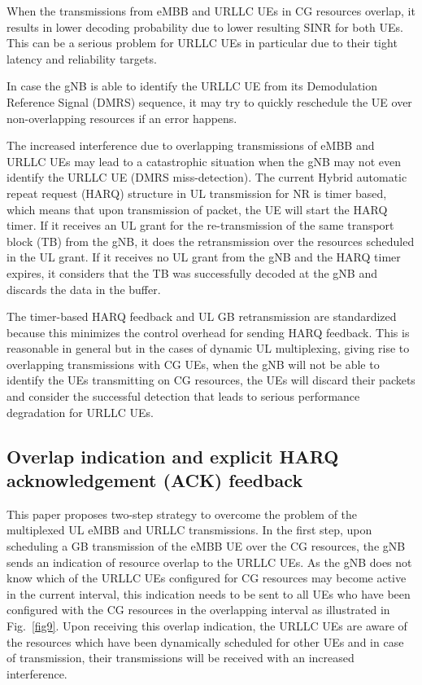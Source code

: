 \documentclass{report}
\begin{document}
When the transmissions from eMBB and URLLC UEs in CG resources overlap, it results in lower decoding probability due to lower resulting SINR for both UEs. This can be a serious problem for URLLC UEs in particular due to their tight latency and reliability targets.

In case the gNB is able to identify the URLLC UE from its Demodulation Reference Signal (DMRS) sequence, it may try to quickly reschedule the UE over non-overlapping resources if an error happens.

The increased interference due to overlapping transmissions of eMBB and URLLC UEs may lead to a catastrophic situation when the gNB may not even identify the URLLC UE (DMRS miss-detection). The current Hybrid automatic repeat request (HARQ) structure in UL transmission for NR is timer based, which means that upon transmission of packet, the UE will start the HARQ timer. If it receives an UL grant for the re-transmission of the same transport block (TB) from the gNB, it does the retransmission over the resources scheduled in the UL grant. If it receives no UL grant from the gNB and the HARQ timer expires, it considers that the TB was successfully decoded at the gNB and discards the data in the buffer. 

The timer-based HARQ feedback and UL GB retransmission are standardized because this minimizes the control overhead for sending HARQ feedback. This is reasonable in general but in the cases of dynamic UL multiplexing, giving rise to overlapping transmissions with CG UEs, when the gNB will not be able to identify the UEs transmitting on CG resources, the UEs will discard their packets and consider the successful detection that leads to serious performance degradation for URLLC UEs.

\subsection{Overlap indication and explicit HARQ acknowledgement (ACK) feedback}\label{232}

This paper proposes two-step strategy to overcome the problem of the multiplexed UL eMBB and URLLC transmissions. In the first step, upon scheduling a GB transmission of the eMBB UE over the CG resources, the gNB sends an indication of resource overlap to the URLLC UEs. As the gNB does not know which of the URLLC UEs configured for CG resources may become active in the current interval, this indication needs to be sent to all UEs who have been configured with the CG resources in the overlapping interval as illustrated in Fig.~\ref{fig9}. Upon receiving this overlap indication, the URLLC UEs are aware of the resources which have been dynamically scheduled for other UEs and in case of transmission,  their transmissions will be received with an increased interference.
\end{document}

